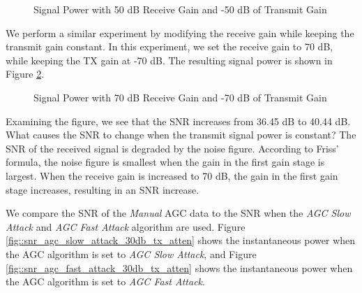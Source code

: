 \documentclass{article}
\begin{document}
\begin{figure}[H]
	\centerline{}
	\caption{Signal Power with 50 dB Receive Gain and -50 dB of Transmit Gain}
	\label{fig::snr_manual_agc_50db_rx_gain_50db_tx_atten}
\end{figure}

We perform a similar experiment by modifying the receive gain while keeping the transmit gain constant. In this experiment, we set the receive gain to 70 dB, while keeping the TX gain at -70 dB. The resulting signal power is shown in Figure \ref{fig::snr_manual_agc_70db_rx_gain_70db_tx_atten}.

\begin{figure}[H]
	\centerline{}
	\caption{Signal Power with 70 dB Receive Gain and -70 dB of Transmit Gain}
	\label{fig::snr_manual_agc_70db_rx_gain_70db_tx_atten}
\end{figure}

Examining the figure, we see that the SNR increases from 36.45 dB to 40.44 dB. What causes the SNR to change when the transmit signal power is constant? The SNR of the received signal is degraded by the noise figure. According to Friss' formula, the noise figure is smallest when the gain in the first gain stage is largest. When the receive gain is increased to 70 dB, the gain in the first gain stage increases, resulting in an SNR increase.

We compare the SNR of the \textit{Manual} AGC data to the SNR when the \textit{AGC Slow Attack} and \textit{AGC Fast Attack} algorithm are used. Figure \ref{fig::snr_agc_slow_attack_30db_tx_atten} shows the instantaneous power when the AGC algorithm is set to \textit{AGC Slow Attack}, and Figure \ref{fig::snr_agc_fast_attack_30db_tx_atten} shows the instantaneous power when the AGC algorithm is set to \textit{AGC Fast Attack}.
\end{document}
